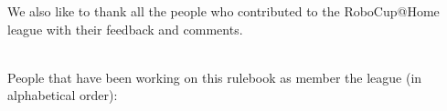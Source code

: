 We also like to thank all the people who contributed to the RoboCup@Home league with their feedback and comments. 

~\\\noindent People that have been working on this rulebook as member the league (in alphabetical order):
\begin{multicols}{3}%
\noindent%
\columnbreak%
\columnbreak%
\end{multicols}

